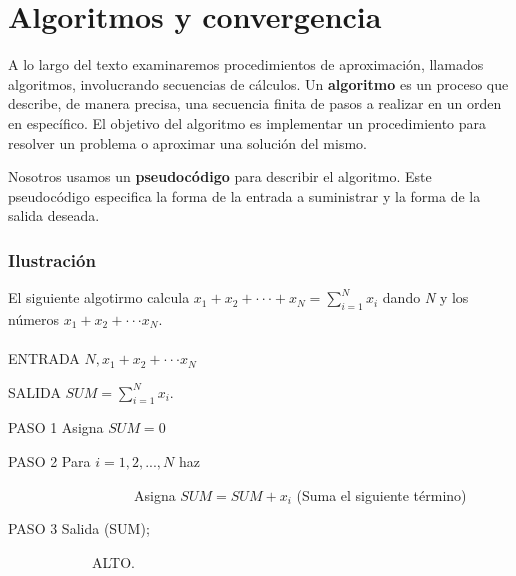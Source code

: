 \section*{Algoritmos y convergencia} 

A lo largo del texto examinaremos procedimientos de aproximación, llamados algoritmos, involucrando secuencias de cálculos. Un \textbf{algoritmo} es un proceso que describe, de manera precisa, una secuencia finita de pasos a realizar en un orden en específico. El objetivo del algoritmo es implementar un procedimiento para resolver un problema o aproximar una solución del mismo.

Nosotros usamos un \textbf{pseudocódigo} para describir el algoritmo. Este pseudocódigo especifica la forma de la entrada a suministrar y la forma de la salida deseada.

\begin{tcolorbox}[colback=blue!15!]
\subsubsection*{Ilustración}
El siguiente algotirmo calcula $x_1+x_2+\cdot\cdot\cdot+ x_N=\displaystyle\sum_{i=1}^{N} x_i$ dando \textit{N} y los números $x_1+x_2+\cdot\cdot\cdot x_N$.
\\ \\
ENTRADA $N,x_1+x_2+\cdot\cdot\cdot x_N$

SALIDA $SUM=\sum_{i=1}^{N} x_i$.

PASO 1 Asigna $SUM=0$

PASO 2 Para $i=1,2,...,N$ haz

\ \ \ \ \ \ \ \ \ \ \ \ \ \ \ \ \ \ Asigna $SUM=SUM+x_i$ (Suma el siguiente término)

PASO 3 Salida (SUM);

\ \ \ \ \ \ \ \ \ \ \ \ ALTO.
\end{tcolorbox}
